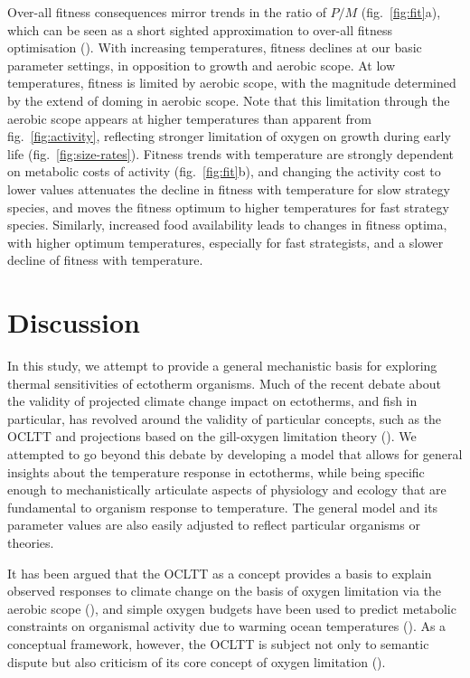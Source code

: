 \documentclass[11pt]{article}\usepackage[]{graphicx}\usepackage[]{color,soul}
\begin{document}
Over-all fitness consequences mirror trends in the ratio of $P/M$ (fig.~\ref{fig:fit}a), which can be seen as a short sighted approximation to over-all fitness optimisation (\citealt{sainmont_effective_2015}). With increasing temperatures, fitness declines at our basic parameter settings, in opposition to growth and aerobic scope. At low temperatures, fitness is limited by aerobic scope, with the magnitude determined by the extend of doming in aerobic scope. Note that this limitation through the aerobic scope appears at higher temperatures than apparent from fig.~\ref{fig:activity}, reflecting stronger limitation of oxygen on growth during early life (fig.~\ref{fig:size-rates}). Fitness trends with temperature are strongly dependent on metabolic costs of activity (fig.~\ref{fig:fit}b), and changing the activity cost to lower values attenuates the decline in fitness with temperature for slow strategy species, and moves the fitness optimum to higher temperatures for fast strategy species. Similarly, increased food availability leads to changes in fitness optima, with higher optimum temperatures, especially for fast strategists, and a slower decline of fitness with temperature.

\section*{Discussion}

In this study, we attempt to provide a general mechanistic basis for exploring thermal sensitivities of ectotherm organisms. Much of the recent debate about the validity of projected climate change impact on ectotherms, and fish in particular, has revolved around the validity of particular concepts, such as the OCLTT and projections based on the gill-oxygen limitation theory (\citealt{pauly_sound_2017,lefevre_modelling_2017}). We attempted to go beyond this debate by developing a model that allows for general insights about the temperature response in ectotherms, while being specific enough to mechanistically articulate aspects of physiology and ecology that are fundamental to organism response to temperature. The general model and its parameter values are also easily adjusted to reflect particular organisms or theories. 

It has been argued that the OCLTT as a concept provides a basis to explain observed responses to climate change on the basis of oxygen limitation via the aerobic scope (\citealt{portner_physiology_2008,portner_oxygen-and_2010}), and simple oxygen budgets have been used to predict metabolic constraints on organismal activity due to warming ocean temperatures (\citealt{deutsch_climate_2015}). As a conceptual framework, however, the OCLTT is subject not only to semantic dispute but also criticism of its core concept of oxygen limitation (\citealt{jutfelt_oxygen-and_2018,lefevre_are_2016}).
\end{document}
